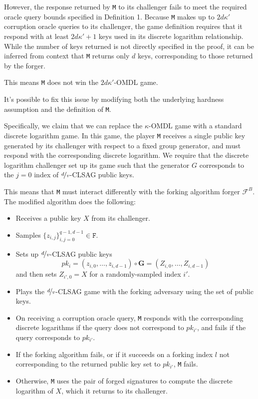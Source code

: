 \documentclass{article}
\begin{document}
However, the response returned by \texttt{M} to its challenger fails to meet the required oracle query bounds specified in Definition 1.
Because \texttt{M} makes up to $2d\kappa'$ corruption oracle queries to its challenger, the game definition requires that it respond with at least $2d\kappa' + 1$ keys used in its discrete logarithm relationship.
While the number of keys returned is not directly specified in the proof, it can be inferred from context that \texttt{M} returns only $d$ keys, corresponding to those returned by the forger.

This means \texttt{M} does not win the $2d\kappa'$-OMDL game.

It's possible to fix this issue by modifying both the underlying hardness assumption and the definition of \texttt{M}.

Specifically, we claim that we can replace the $\kappa$-OMDL game with a standard discrete logarithm game.
In this game, the player \texttt{M} receives a single public key generated by its challenger with respect to a fixed group generator, and must respond with the corresponding discrete logarithm.
We require that the discrete logarithm challenger set up its game such that the generator $G$ corresponds to the $j = 0$ index of $\nicefrac{d}{v}$-CLSAG public keys.

This means that \texttt{M} must interact differently with the forking algorithm forger $\mathcal{F}^B$.
The modified algorithm does the following:
\begin{itemize}
	\item Receives a public key $X$ from its challenger.
	\item Samples $\{z_{i,j}\}_{i,j=0}^{q-1,d-1} \in \texttt{F}$.
	\item Sets up $\nicefrac{d}{v}$-CLSAG public keys $$pk_i = (z_{i,0}, \ldots, z_{i,d-1}) \circ \bm{G} = (Z_{i,0}, \ldots, Z_{i,d-1})$$ and then sets $Z_{i',0} = X$ for a randomly-sampled index $i'$.
	\item Plays the $\nicefrac{d}{v}$-CLSAG game with the forking adversary using the set of public keys.
	\item On receiving a corruption oracle query, \texttt{M} responds with the corresponding discrete logarithms if the query does not correspond to $pk_{i'}$, and fails if the query corresponds to $pk_{i'}$.
	\item If the forking algorithm fails, or if it succeeds on a forking index $l$ not corresponding to the returned public key set to $pk_{i'}$, \texttt{M} fails.
	\item Otherwise, \texttt{M} uses the pair of forged signatures to compute the discrete logarithm of $X$, which it returns to its challenger.
\end{itemize}
\end{document}
